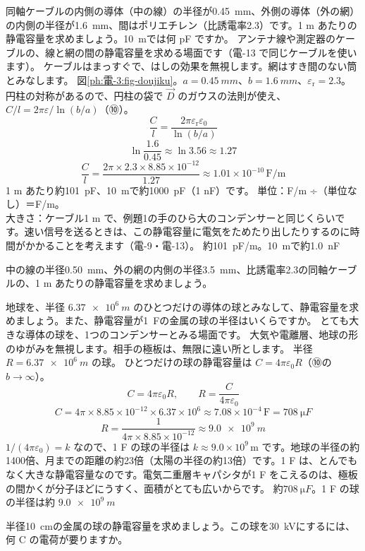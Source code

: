 \label{ph:電-3:ex9}
\begin{phreidai}[同軸ケーブルの静電容量]
同軸ケーブルの内側の導体（中の線）の半径が\qty{0.45}{mm}、外側の導体（外の網）の内側の半径が\qty{1.6}{mm}、間はポリエチレン（比誘電率2.3）です。1 m あたりの静電容量を求めましょう。\qty{10}{m}では何 pF ですか。
\phbamen
アンテナ線や測定器のケーブルの、線と網の間の静電容量を求める場面です（電-13 で同じケーブルを使います）。
\phmushi
ケーブルはまっすぐで、はしの効果を無視します。網はすき間のない筒とみなします。
\phzu
図\ref{ph:電-3:fig-doujiku}。$a=\qty{0.45}{mm}$、$b=\qty{1.6}{mm}$、$\varepsilon_{\mathrm r}=2.3$。
\phriyu
円柱の対称があるので、円柱の袋で $\vec D$ のガウスの法則が使え、$C/l=2\pi\varepsilon/\ln(b/a)$（⑩）。
\phtateru
\[\frac{C}{l}=\frac{2\pi\varepsilon_{\mathrm r}\varepsilon_0}{\ln(b/a)}\]
\phtoku
\[\ln\frac{1.6}{0.45}\approx\ln3.56\approx1.27\]
\[\frac{C}{l}=\frac{2\pi\times2.3\times8.85\times10^{-12}}{1.27}\approx1.01\times10^{-10}\,\text{F/m}\]
1 m あたり約\qty{101}{pF}、\qty{10}{m}で約\qty{1000}{pF}（1 nF）です。
\phtashikame
単位：F/m ÷（単位なし）＝F/m。\\
大きさ：ケーブル1 m で、例題1の手のひら大のコンデンサーと同じくらいです。速い信号を送るときは、この静電容量に電気をためたり出したりするのに時間がかかることを考えます（電-9・電-13）。
\kotae 約\qty{101}{pF/m}。\qty{10}{m}で約\qty{1.0}{nF}
\end{phreidai}
\begin{jibun}
中の線の半径\qty{0.50}{mm}、外の網の内側の半径\qty{3.5}{mm}、比誘電率2.3の同軸ケーブルの、1 m あたりの静電容量を求めましょう。
\end{jibun}

\label{ph:電-3:ex10}
\begin{phreidai}[地球の静電容量]
地球を、半径 $\qty{6.37e6}{m}$ のひとつだけの導体の球とみなして、静電容量を求めましょう。また、静電容量が\qty{1}{F}の金属の球の半径はいくらですか。
\phbamen
とても大きな導体の球を、1つのコンデンサーとみる場面です。
\phmushi
大気や電離層、地球の形のゆがみを無視します。相手の極板は、無限に遠い所とします。
\phzu
半径 $R=\qty{6.37e6}{m}$ の球。
\phriyu
ひとつだけの球の静電容量は $C=4\pi\varepsilon_0R$（⑩の $b\to\infty$）。
\phtateru
\[C=4\pi\varepsilon_0R,\qquad R=\frac{C}{4\pi\varepsilon_0}\]
\phtoku
\[C=4\pi\times8.85\times10^{-12}\times6.37\times10^6\approx7.08\times10^{-4}\,\text{F}=\qty{708}{\micro F}\]
\[R=\frac{1}{4\pi\times8.85\times10^{-12}}\approx\qty{9.0e9}{m}\]
\phtashikame
$1/(4\pi\varepsilon_0)=k$ なので、1 F の球の半径は $k\approx9.0\times10^9$\,m です。地球の半径の約1400倍、月までの距離の約23倍（太陽の半径の約13倍）です。1 F は、とんでもなく大きな静電容量なのです。電気二重層キャパシタが1 F をこえるのは、極板の間かくが分子ほどにうすく、面積がとても広いからです。
\kotae 約$\qty{708}{\micro F}$。1 F の球の半径は約 $\qty{9.0e9}{m}$
\end{phreidai}
\begin{jibun}
半径\qty{10}{cm}の金属の球の静電容量を求めましょう。この球を\qty{30}{kV}にするには、何 C の電荷が要りますか。
\end{jibun}

